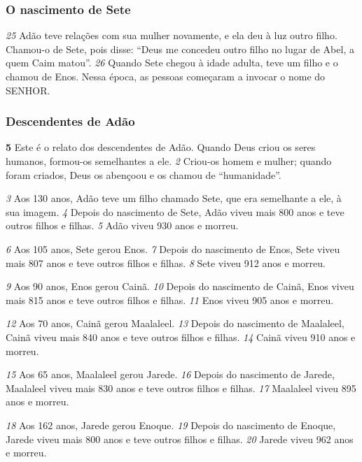\bigskip
\subsubsection*{O nascimento de Sete}
\textit{\tiny 25}
Adão teve relações com sua mulher novamente, e ela deu à luz outro filho.
Chamou-o de Sete, pois disse: “Deus me concedeu outro filho no lugar de Abel, a
quem Caim matou”.  
\textit{\tiny 26}
Quando Sete chegou à idade adulta, teve um filho e o
chamou de Enos. Nessa época, as pessoas começaram a invocar o nome do
SENHOR.

\bigskip
\subsubsection*{Descendentes de Adão}
\textbf{\large 5} 
Este é o relato dos descendentes de Adão. Quando Deus criou os seres
humanos, formou-os semelhantes a ele. 
\textit{\tiny 2}
Criou-os homem e mulher; quando
foram criados, Deus os abençoou e os chamou de “humanidade”.

\bigskip
\textit{\tiny 3}
Aos   130 anos, Adão teve um filho chamado Sete, que era semelhante a ele, à sua
 imagem. 
\textit{\tiny 4}
Depois do nascimento de Sete, Adão viveu mais 800 anos e teve outros
 filhos e filhas. 
\textit{\tiny 5}
Adão viveu 930 anos e morreu.

\bigskip
\textit{\tiny 6}
Aos 105 anos, Sete gerou Enos. 
\textit{\tiny 7}
Depois do nascimento de Enos, Sete viveu mais 807 anos e teve outros filhos e filhas. 
\textit{\tiny 8}
Sete viveu 912 anos e morreu.

\bigskip
\textit{\tiny 9}
Aos 90 anos, Enos gerou Cainã. 
\textit{\tiny 10}
Depois do nascimento de Cainã, Enos viveu mais 815 anos e teve outros filhos e filhas.  
\textit{\tiny 11}
Enos viveu 905 anos e morreu.

\bigskip
\textit{\tiny 12}
Aos 70 anos, Cainã gerou Maalaleel.  
\textit{\tiny 13}
Depois do nascimento de Maalaleel,
 Cainã viveu mais 840 anos e teve outros filhos e filhas.  
\textit{\tiny 14}
Cainã viveu 910 anos e morreu.

\bigskip
\textit{\tiny 15}
Aos 65 anos, Maalaleel gerou Jarede.  
\textit{\tiny 16}
Depois do nascimento de Jarede,
 Maalaleel viveu mais 830 anos e teve outros filhos e filhas.  
\textit{\tiny 17}
Maalaleel viveu 895 anos e morreu.

\bigskip
\textit{\tiny 18}
Aos 162 anos, Jarede gerou Enoque.  
\textit{\tiny 19}
Depois do nascimento de Enoque, Jarede
 viveu mais 800 anos e teve outros filhos e filhas.  
\textit{\tiny 20}
Jarede viveu 962 anos e
 morreu.

